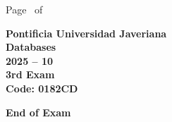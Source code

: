 \documentclass[11pt, addpoints]{exam}\usepackage[utf8]{inputenc}
\begin{document}
\begin{coverpages}
\begin{center}
			\vspace{3mm}
			\leavevmode \hspace{5mm} 
		\end{center}
	\end{coverpages}

	\footer{} {Page \thepage\ of \numpages} {}

	\centering
	\textbf{\Large Pontificia Universidad Javeriana}\\
	\textbf{\Large Databases} \\
	\textbf{\large 2025 -- 10} \\
	\textbf{\large 3rd Exam} \\
	\textbf{Code: 0182CD}


	\begin{questions}
		
		
		
		
		
		
		
		
		
		
		
		
		
		
		
		
		
		
		
		
	\end{questions}

	\vspace{5mm}
	\noindent \textbf{End of Exam}
\end{document}
